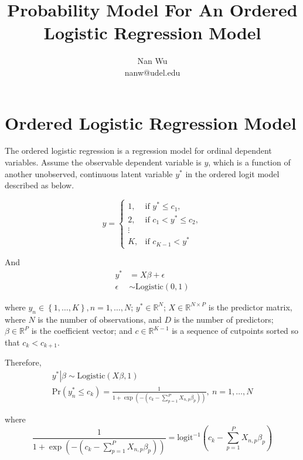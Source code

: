\documentclass[12pt]{article}
\def\eqa{\left(c_k - \sum \limits_{p=1}^P X_{n,p}\beta_p \right)}
\begin{document}
\title{Probability Model For An Ordered Logistic Regression Model}
\author{Nan Wu \\ nanw@udel.edu}
\date{}
\maketitle

\section{Ordered Logistic Regression Model}

The ordered logistic regression is a regression model for ordinal dependent variables. Assume the observable dependent variable is $y$, which is a function of another unobserved, continuous latent variable $y^*$ in the ordered logit model described as below.

\begin{equation*}
  y= \begin{cases}
    1, & \text{if $y^* \leq c_1$},\\
    2, & \text{if $c_1 < y^* \leq c_2$},\\
    \vdots \\
    K, & \text{if $c_{K-1} < y^*$}
  \end{cases}
\end{equation*}

And
\begin{align*}
  y^* &= X\beta + \epsilon \\
  \epsilon &\sim \mathrm{Logistic}\left(0,1\right)
\end{align*}

where $y_n \in \left \{1,\ldots, K\right \}, n=1,\ldots,N$; $y^* \in \mathbb{R}^N$; $X\in \mathbb{R}^{N \times P}$ is the predictor matrix, where $N$ is the number of observations, and $D$ is the number of predictors; $\beta \in \mathbb{R}^P$ is the coefficient vector; and $c \in \mathbb{R}^{K-1}$  is a sequence of cutpoints sorted so that $c_k<c_{k+1}$.

Therefore,
\begin{gather*}
  \left. y^* \right|\beta \sim \mathrm{Logistic}\left(X\beta, 1\right)\\
  \mathrm{Pr}\left(y^*_n \leq c_k\right)=\frac{1}{1+\exp \left(-\eqa \right)}, \ n=1,\ldots,N
\end{gather*}

where
\begin{equation}
  \frac{1}{1+\exp \left(- \eqa \right)}= \mathrm{logit}^{-1}\eqa
\end{equation}
\end{document}
